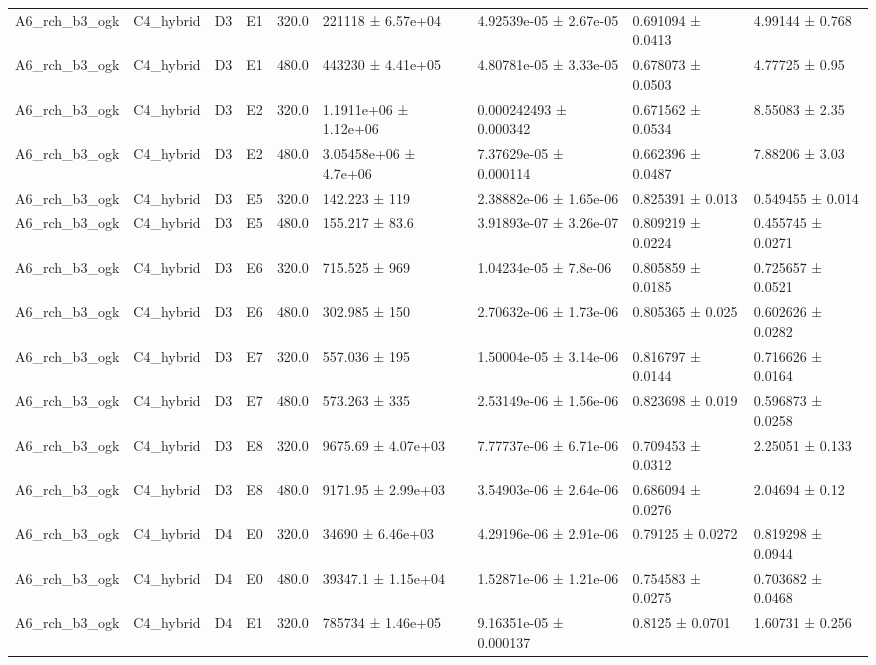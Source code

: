\begin{table}
\begin{tabular}{lllllllll}
A6\_rch\_b3\_ogk & C4\_hybrid & D3 & E1 & 320.0 & 221118 ± 6.57e+04 & 4.92539e-05 ± 2.67e-05 & 0.691094 ± 0.0413 & 4.99144 ± 0.768 \\
A6\_rch\_b3\_ogk & C4\_hybrid & D3 & E1 & 480.0 & 443230 ± 4.41e+05 & 4.80781e-05 ± 3.33e-05 & 0.678073 ± 0.0503 & 4.77725 ± 0.95 \\
A6\_rch\_b3\_ogk & C4\_hybrid & D3 & E2 & 320.0 & 1.1911e+06 ± 1.12e+06 & 0.000242493 ± 0.000342 & 0.671562 ± 0.0534 & 8.55083 ± 2.35 \\
A6\_rch\_b3\_ogk & C4\_hybrid & D3 & E2 & 480.0 & 3.05458e+06 ± 4.7e+06 & 7.37629e-05 ± 0.000114 & 0.662396 ± 0.0487 & 7.88206 ± 3.03 \\
A6\_rch\_b3\_ogk & C4\_hybrid & D3 & E5 & 320.0 & 142.223 ± 119 & 2.38882e-06 ± 1.65e-06 & 0.825391 ± 0.013 & 0.549455 ± 0.014 \\
A6\_rch\_b3\_ogk & C4\_hybrid & D3 & E5 & 480.0 & 155.217 ± 83.6 & 3.91893e-07 ± 3.26e-07 & 0.809219 ± 0.0224 & 0.455745 ± 0.0271 \\
A6\_rch\_b3\_ogk & C4\_hybrid & D3 & E6 & 320.0 & 715.525 ± 969 & 1.04234e-05 ± 7.8e-06 & 0.805859 ± 0.0185 & 0.725657 ± 0.0521 \\
A6\_rch\_b3\_ogk & C4\_hybrid & D3 & E6 & 480.0 & 302.985 ± 150 & 2.70632e-06 ± 1.73e-06 & 0.805365 ± 0.025 & 0.602626 ± 0.0282 \\
A6\_rch\_b3\_ogk & C4\_hybrid & D3 & E7 & 320.0 & 557.036 ± 195 & 1.50004e-05 ± 3.14e-06 & 0.816797 ± 0.0144 & 0.716626 ± 0.0164 \\
A6\_rch\_b3\_ogk & C4\_hybrid & D3 & E7 & 480.0 & 573.263 ± 335 & 2.53149e-06 ± 1.56e-06 & 0.823698 ± 0.019 & 0.596873 ± 0.0258 \\
A6\_rch\_b3\_ogk & C4\_hybrid & D3 & E8 & 320.0 & 9675.69 ± 4.07e+03 & 7.77737e-06 ± 6.71e-06 & 0.709453 ± 0.0312 & 2.25051 ± 0.133 \\
A6\_rch\_b3\_ogk & C4\_hybrid & D3 & E8 & 480.0 & 9171.95 ± 2.99e+03 & 3.54903e-06 ± 2.64e-06 & 0.686094 ± 0.0276 & 2.04694 ± 0.12 \\
A6\_rch\_b3\_ogk & C4\_hybrid & D4 & E0 & 320.0 & 34690 ± 6.46e+03 & 4.29196e-06 ± 2.91e-06 & 0.79125 ± 0.0272 & 0.819298 ± 0.0944 \\
A6\_rch\_b3\_ogk & C4\_hybrid & D4 & E0 & 480.0 & 39347.1 ± 1.15e+04 & 1.52871e-06 ± 1.21e-06 & 0.754583 ± 0.0275 & 0.703682 ± 0.0468 \\
A6\_rch\_b3\_ogk & C4\_hybrid & D4 & E1 & 320.0 & 785734 ± 1.46e+05 & 9.16351e-05 ± 0.000137 & 0.8125 ± 0.0701 & 1.60731 ± 0.256 \\

\end{tabular}
\end{table}
